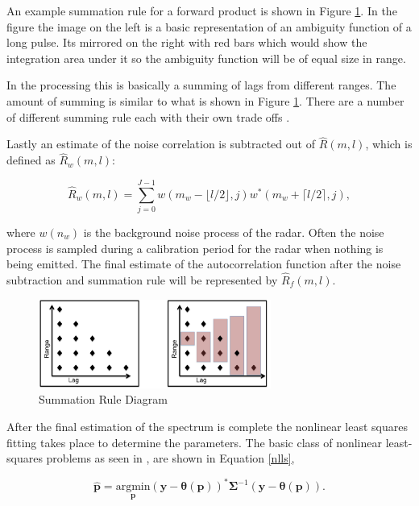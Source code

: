 \documentclass[draft,ras]{agutex}
\begin{document}
\begin{article}
An example summation rule for a forward product is shown in Figure \ref{fig:sumrule}. In the figure the image on the left is a basic representation of an ambiguity function of a long pulse.  Its mirrored on the right with red bars which would show the integration area under it so the ambiguity function will be of equal size in range.  

In the processing this is basically a summing of lags from different ranges.  The amount of summing is similar to what is shown in Figure \ref{fig:sumrule}.  There are a number of different summing rule each with their own trade offs \citep{nygren1996}.  

Lastly an estimate of the noise correlation is subtracted out of $\hat{R}(m,l)$, which is defined as $\hat{R}_w(m,l)$:

\begin{equation}
\label{eq:lagpronoise}
\hat{R}_w(m,l) = \displaystyle\sum\limits_{j=0}^{J-1} w(m_w-\lfloor l/2\rfloor,j)w^*(m_w+\lceil l/2 \rceil,j),
\end{equation}

\noindent where $w(n_w)$ is the background noise process of the radar.  Often the noise process is sampled during a calibration period for the radar when nothing is being emitted.  The final estimate of the autocorrelation function after the noise subtraction and summation rule will be represented by $\hat{R}_f(m,l)$.
\begin{figure}[!t]
\centering
\includegraphics[width=3in]{sumrule}
\caption{Summation Rule Diagram}
\label{fig:sumrule}
\end{figure}

After the final estimation of the spectrum is complete the nonlinear least squares fitting takes place to determine the parameters.  The basic class of nonlinear least-squares problems as seen in \citep{kayvol1}, are shown in Equation \ref{nlls},

\begin{equation}
	\hat{\mathbf{p}}= \underset{\mathbf{p}}{\text{argmin}} (\mathbf{y}-\bm{\theta}(\mathbf{p}))^*\bm{\Sigma}^{-1}(\mathbf{y}-\bm{\theta}(\mathbf{p})).
\label{nlls}
\end{equation}


\end{article}
\end{document}

